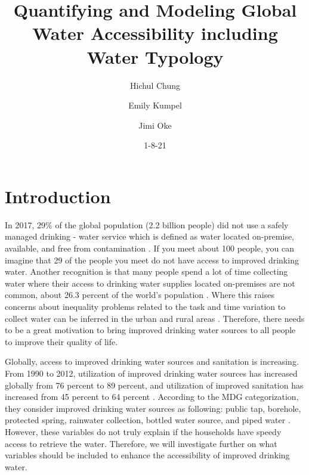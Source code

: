 \documentclass[10pt,twoside]{article}
\numberwithin{equation}{section}
\newcommand{\?}{\stackrel{?}{=}}
\begin{document}
\vspace{-3ex}
\title{Quantifying and Modeling Global Water Accessibility including Water Typology}
\author{Hichul Chung \and Emily Kumpel \and Jimi Oke}
\date{1-8-21}
\maketitle



\section{Introduction}
In 2017, 29\% of the global population (2.2 billion people) did not use a safely managed drinking - water service which is defined as water located on-premise, available, and free from contamination \citep{WHOdrinkingwater}.   If you meet about 100 people, you can imagine that 29 of the people you meet do not have access to improved drinking water. Another recognition is that many people spend a lot of time collecting water where their access to drinking water
supplies located on-premises are not common, about 26.3 percent of the world's population
\citep{cassivi2018access}. Where this raises concerns about inequality problems related to the task and time variation 
to collect water can be inferred in the urban and rural areas \citep{cassivi2018access}. Therefore, there needs to be a
great motivation to bring improved drinking water sources to all people to improve their quality of life.


Globally, access to improved drinking water sources and sanitation is increasing. From 1990 to 2012, utilization of
improved drinking water sources has increased globally from 76 percent to 89 percent, and utilization of improved
sanitation has increased from 45 percent to 64 percent \citep{fuller2016tracking}. According to the MDG categorization,
they consider improved drinking water sources as following: public tap, borehole, protected spring, rainwater
collection, bottled water source, and piped water \citep{bartram2014globala}. However, these variables do not truly
explain if the households have speedy access to retrieve the water. Therefore, we will investigate further on what
variables should be included to enhance the accessibility of improved drinking water.
\end{document}
